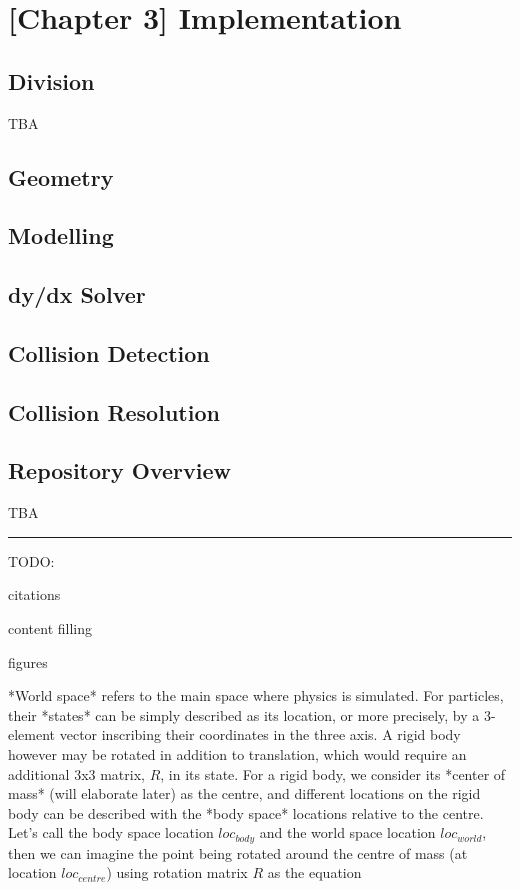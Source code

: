 \documentclass[runningheads]{llncs}
\begin{document}
\chapter{[Chapter 3] Implementation}

\section{Division}

TBA

\section{Geometry}

\section{Modelling}

\section{dy/dx Solver}

\section{Collision Detection}

\section{Collision Resolution}

\section{Repository Overview}

TBA

\noindent\rule{12cm}{0.4pt}

TODO:

citations

content filling

figures

*World space* refers to the main space where physics is simulated. For particles, their *states* can be simply described as its location, or more precisely, by a 3-element vector inscribing their coordinates in the three axis. A rigid body however may be rotated in addition to translation, which would require an additional 3x3 matrix, $R$, in its state. For a rigid body, we consider its *center of mass* (will elaborate later) as the centre, and different locations on the rigid body can be described with the *body space* locations relative to the centre. Let's call the body space location $loc_{body}$ and the world space location $loc_{world}$, then we can imagine the point being rotated around the centre of mass (at location $loc_{centre}$) using rotation matrix $R$ as the equation
\end{document}
